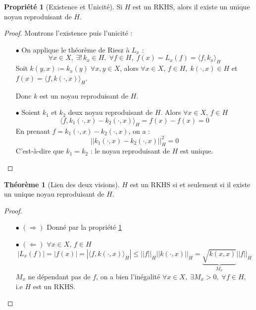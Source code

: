\documentclass[a4paper, 11pt, french]{article}
\theoremstyle{definition}
\newtheorem{theorem}{Théorème}
\newtheorem{property}{Propriété}
\begin{document}
	\begin{property}[Existence et Unicité]
	\label{th:existunicity}
		Si $H$ est un RKHS, alors il existe un unique noyau reproduisant de $H$.
	\end{property}
	\begin{proof}
		Montrons l'existence puis l'unicité : \\
		\begin{itemize} 
			\item[$\bullet$]
			On applique le théorème de Riesz à $L_x$ :
			\[\forall x \in X, \; \exists ! \, k_x \in H, \; \forall f \in H, \; f(x) = L_x (f) = \langle f, k_x \rangle_H\]
			Soit $k(y, x) \coloneqq k_x(y) \; \forall x,y \in X$, alors $\forall x \in X, \, f \in H, \; k(\cdot, x) \in H$ et  $f(x) = \langle f, k(\cdot, x) \rangle_H$.
			
			Donc $k$ est un noyau reproduisant de $H$.
			
			\item[$\bullet$]
			Soient $k_1$ et $k_2$ deux noyau reproduisant de $H$. Alors $\forall x \in X, \, f \in H$
			\[\langle f, k_1(\cdot, x) - k_2(\cdot, x) \rangle_H = f(x) - f(x) = 0\]
			En prenant $f = k_1(\cdot, x) - k_2(\cdot, x)$, on a :
			\[\left|\left| k_1(\cdot, x) - k_2(\cdot, x) \right|\right|_H^2 = 0\]
			C'est-à-dire que $k_1 = k_2$ : le noyau reproduisant de $H$ est unique.
		\end{itemize}
	\end{proof}

	\begin{theorem}[Lien des deux visions]
		\label{th:link2visions}
		$H$ est un RKHS si et seulement si il existe un unique noyau reproduisant de $H$.
	\end{theorem}
	\begin{proof}
		\begin{itemize}
			\item[$\bullet$] $(\Rightarrow)$
				Donné par la propriété \ref{th:existunicity} 
			\item[$\bullet$] $(\Leftarrow)$ $\forall x \in X, \, f \in H$
				\[|L_x(f)| = |f(x)| = |\langle f, k(\cdot, x) \rangle_H| \leq ||f||_H ||k(\cdot,x)||_H = \underbrace{\sqrt{k(x,x)}}_{\text{$M_x$}} ||f||_H\]
				$M_x$ ne dépendant pas de $f$, on a bien l'inégalité $\forall x \in X, \;  \exists M_x > 0, \; \forall f \in H$, i.e $H$ est un RKHS.
		\end{itemize}
	\end{proof}
	
\end{document}
